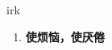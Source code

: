 
\begin{frame}
{\huge irk}
\begin{center}
\begin{enumerate}\Large
  \item \textbf{使烦恼，使厌倦}
\end{enumerate}
\end{center}
\end{frame}
